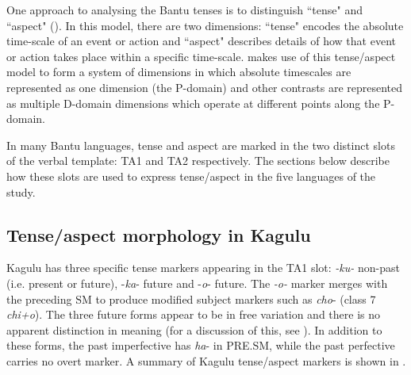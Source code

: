 \documentclass[output=paper,
            colorlinks, citecolor=brown
            ,draftmode
		  ]{langscibook}
\begin{document}
One approach to analysing the Bantu tenses is to distinguish ``tense" and ``aspect" (\citealt{Dahl1985, Nurse2008}). In this model, there are two dimensions: ``tense" encodes the absolute time-scale of an event or action and ``aspect" describes details of how that event or action takes place within a specific time-scale. \citet{BotneKershner2008} makes use of this tense/aspect model to form a system of dimensions in which absolute timescales are represented as one dimension (the P-domain) and other contrasts are represented as multiple D-domain dimensions which operate at different points along the P-domain.



In many Bantu languages, tense and aspect are marked in the two distinct slots of the verbal template: TA1 and TA2 respectively. The sections below describe how these slots are used to express tense/aspect in the five languages of the study.


\subsection{Tense/aspect morphology in Kagulu}\label{sec:petzell:3.2}

Kagulu has three specific tense markers appearing in the TA1 slot: \textit{{}-ku-} non-past (i.e. present or future), -\textit{ka}{}- future and -\textit{o}{}- future. The \textit{{}-o-} marker merges with the preceding SM to produce modified subject markers such as \textit{cho}{}- (class 7 \textit{chi+o}). The three future forms appear to be in free variation and there is no apparent distinction in meaning (for a discussion of this, see \citealt[108--109]{Petzell2008}). In addition to these forms, the past imperfective has \textit{ha}{}- in PRE.SM, while the past perfective carries no overt marker. A summary of Kagulu tense/aspect markers is shown in .
\end{document}
